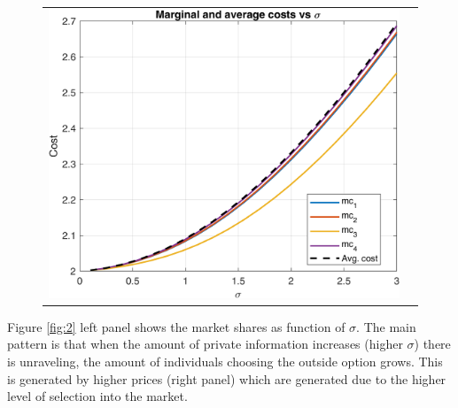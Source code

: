 \documentclass[12pt]{article}
\theoremstyle{plain}
\theoremstyle{plain}
\begin{document}
\begin{figure}[H]
\caption{}
 \label{fig:1}
\centering{}%
\begin{tabular}{cc}
\includegraphics[scale=0.61]{figures/simulations/costs_vs_sigma.png} 
\end{tabular}
\end{figure}


Figure \ref{fig:2} left panel shows the market shares as function of $\sigma$. The main pattern is that when the amount of private information increases (higher $\sigma$) there is unraveling, the amount of individuals choosing the outside option grows. This is generated by higher prices (right panel) which are generated due to the higher level of selection into the market. 
\end{document}
